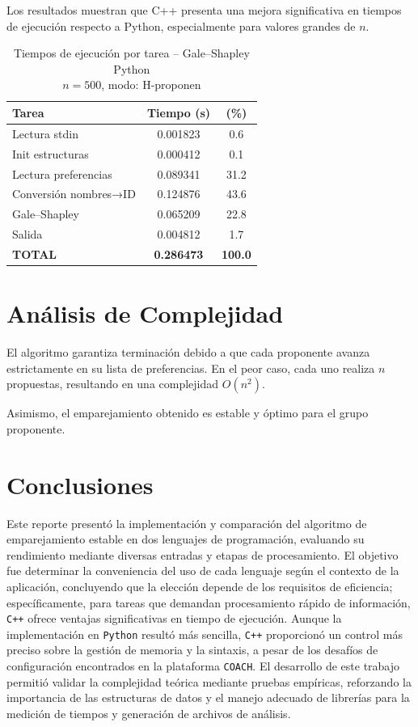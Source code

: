 \documentclass[conference]{IEEEtran}
\begin{document}
Los resultados muestran que C++ presenta una mejora significativa en tiempos de ejecución respecto a Python, especialmente para valores grandes de $n$.


\begin{table}[!t]
\centering
\caption{Tiempos de ejecución por tarea -- Gale--Shapley Python\\
\small $n = 500$, modo: H-proponen}
\label{tab:tiempos-tareas}
\begin{tabular}{|l|c|c|}
\hline
Tarea & Tiempo (s) & (\%) \\
\hline
Lectura stdin         & 0.001823 & 0.6 \\
Init estructuras      & 0.000412 & 0.1 \\
Lectura preferencias  & 0.089341 & 31.2 \\
Conversión nombres→ID & 0.124876 & 43.6 \\
Gale--Shapley         & 0.065209 & 22.8 \\
Salida                & 0.004812 & 1.7 \\
\hline
\textbf{TOTAL} & \textbf{0.286473} & \textbf{100.0} \\
\hline
\end{tabular}
\end{table}


\section{Análisis de Complejidad}
El algoritmo garantiza terminación debido a que cada proponente avanza estrictamente en su lista de preferencias. En el peor caso, cada uno realiza $n$ propuestas, resultando en una complejidad $O(n^2)$.

Asimismo, el emparejamiento obtenido es estable y óptimo para el grupo proponente.



\section{Conclusiones}

Este reporte presentó la implementación y comparación del algoritmo de emparejamiento estable en dos lenguajes de programación, evaluando su rendimiento mediante diversas entradas y etapas de procesamiento. El objetivo fue determinar la conveniencia del uso de cada lenguaje según el contexto de la aplicación, concluyendo que la elección depende de los requisitos de eficiencia; específicamente, para tareas que demandan procesamiento rápido de información, \texttt{C++} ofrece ventajas significativas en tiempo de ejecución. Aunque la implementación en \texttt{Python} resultó más sencilla, \texttt{C++} proporcionó un control más preciso sobre la gestión de memoria y la sintaxis, a pesar de los desafíos de configuración encontrados en la plataforma \texttt{COACH}. El desarrollo de este trabajo permitió validar la complejidad teórica mediante pruebas empíricas, reforzando la importancia de las estructuras de datos y el manejo adecuado de librerías para la medición de tiempos y generación de archivos de análisis.
\end{document}
